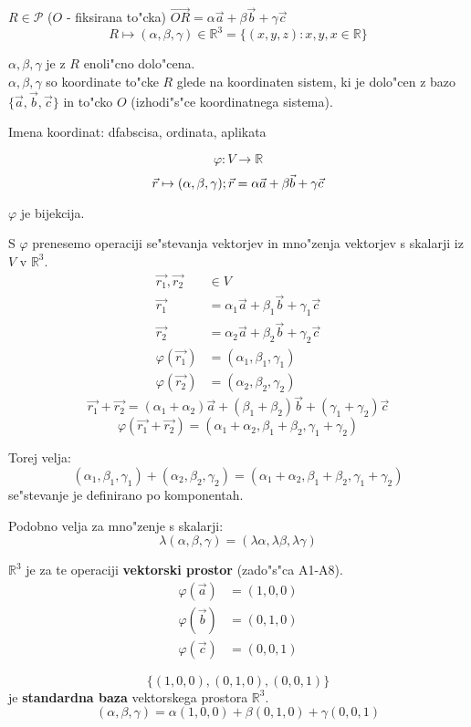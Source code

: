 \(R \in \mathcal{P}\) (\(O\) - fiksirana to"cka)
\(\vec{OR} = \alpha \vec{a} + \beta \vec{b} + \gamma \vec{c}\)
\[R \mapsto (\alpha, \beta, \gamma) \in \mathbb{R}^3 = \{(x, y, z): x, y, x \in \mathbb{R}\}\]

\(\alpha, \beta, \gamma\) je z \(R\) enoli"cno dolo"cena.\\
\(\alpha, \beta, \gamma\) so koordinate to"cke \(R\) glede na koordinaten sistem, ki je dolo"cen z bazo \(\{\vec{a}, \vec{b}, \vec{c}\}\) in to"cko \(O\) (izhodi"s"ce koordinatnega sistema).

Imena koordinat: dfabscisa, ordinata, aplikata

\[\varphi: V \rightarrow \mathbb{R}\]
\[\vec{r} \mapsto (\alpha, \beta, \gamma); \vec{r} = \alpha \vec{a} + \beta \vec{b} + \gamma \vec{c}\]

\(\varphi\) je bijekcija.

S \(\varphi\) prenesemo operaciji se"stevanja vektorjev in mno"zenja vektorjev s skalarji iz \(V\) v \(\mathbb{R}^3\).
\begin{align*}
	\vec{r_1}, \vec{r_2} &\in V\\
	\vec{r_1} &= \alpha_1 \vec{a} + \beta_1 \vec{b} + \gamma_1 \vec{c}\\
	\vec{r_2} &= \alpha_2 \vec{a} + \beta_2 \vec{b} + \gamma_2 \vec{c}\\
	\varphi(\vec{r_1}) &= (\alpha_1, \beta_1, \gamma_1)\\
	\varphi(\vec{r_2}) &= (\alpha_2, \beta_2, \gamma_2)
\end{align*}
\[\vec{r_1} + \vec{r_2} = (\alpha_1 + \alpha_2) \vec{a} + (\beta_1 + \beta_2)\vec{b} + (\gamma_1 + \gamma_2)\vec{c}\]
\[\varphi(\vec{r_1} + \vec{r_2}) = (\alpha_1 + \alpha_2, \beta_1 + \beta_2, \gamma_1 + \gamma_2)\]

Torej velja:
\[(\alpha_1, \beta_1, \gamma_1) + (\alpha_2, \beta_2, \gamma_2) = (\alpha_1 + \alpha_2, \beta_1 + \beta_2, \gamma_1 + \gamma_2)\]
se"stevanje je definirano po komponentah.

Podobno velja za mno"zenje s skalarji:
\[\lambda(\alpha, \beta, \gamma) = (\lambda \alpha, \lambda \beta, \lambda \gamma)\]

\(\mathbb{R}^3\) je za te operaciji \textbf{vektorski prostor} (zado"s"ca A1-A8).
\begin{align*}
	\varphi(\vec{a}) &= (1, 0, 0)\\
	\varphi(\vec{b}) &= (0, 1, 0)\\
	\varphi(\vec{c}) &= (0, 0, 1)
\end{align*}

\[\{(1, 0, 0), (0, 1, 0), (0, 0, 1)\}\] je \textbf{standardna baza} vektorskega prostora \(\mathbb{R}^3\).
\[(\alpha, \beta, \gamma) = \alpha(1, 0, 0) + \beta(0, 1, 0) + \gamma(0, 0, 1)\]


